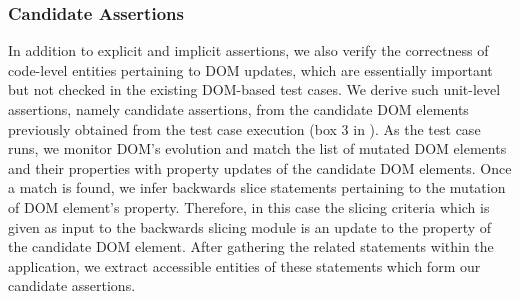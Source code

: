 \subsubsection{Candidate Assertions} \label{Sec:candidateAssertions}
In addition to explicit and implicit assertions, we also verify the correctness of code-level entities pertaining to DOM updates, which are essentially important but not checked in the existing DOM-based test cases. We derive such unit-level assertions, namely candidate assertions, from the candidate DOM elements previously obtained from the test case execution (box 3 in ). As the test case runs, we monitor DOM's evolution and match the list of mutated DOM elements and their properties with property updates of the candidate DOM elements. Once a match is found, we infer backwards slice statements pertaining to the mutation of DOM element's property. Therefore, in this case the slicing criteria which is given as input to the backwards slicing module is an update to the property of the candidate DOM element.
After gathering the related \javascript statements within the application, we extract accessible entities of these statements which form our candidate assertions.     